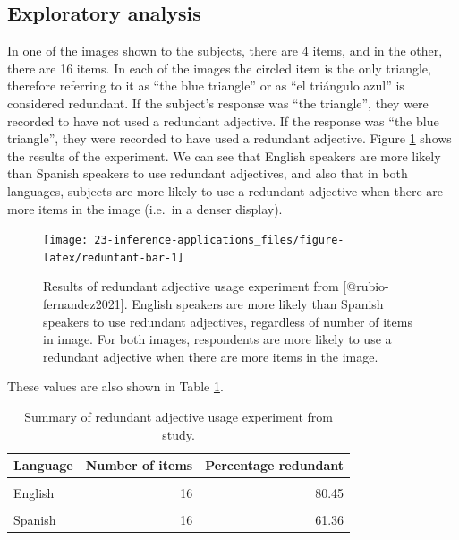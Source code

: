 \documentclass[
  10pt,
  openany]{book}
\begin{document}
\hypertarget{exploratory-analysis}{%
\subsection{Exploratory analysis}\label{exploratory-analysis}}

In one of the images shown to the subjects, there are 4 items, and in the other, there are 16 items.
In each of the images the circled item is the only triangle, therefore referring to it as ``the blue triangle'' or as ``el triángulo azul'' is considered redundant.
If the subject's response was ``the triangle'', they were recorded to have not used a redundant adjective.
If the response was ``the blue triangle'', they were recorded to have used a redundant adjective.
Figure \ref{fig:reduntant-bar} shows the results of the experiment.
We can see that English speakers are more likely than Spanish speakers to use redundant adjectives, and also that in both languages, subjects are more likely to use a redundant adjective when there are more items in the image (i.e.~in a denser display).

\begin{figure}[h]

{\centering \texttt{[image: 23-inference-applications\_files/figure-latex/reduntant-bar-1]} 

}

\caption{Results of redundant adjective usage experiment from [@rubio-fernandez2021]. English speakers are more likely than Spanish speakers to use redundant adjectives, regardless of number of items in image. For both images, respondents are more likely to use a redundant adjective when there are more items in the image.}\label{fig:reduntant-bar}
\end{figure}

These values are also shown in Table \ref{tab:redundant-table}.

\begin{table}[!h]

\caption{\label{tab:redundant-table}Summary of redundant adjective usage experiment from study.}
\centering
\begin{tabular}[t]{>{\raggedright\arraybackslash}p{10em}rr}
\toprule
Language & Number of items & Percentage redundant\\
\midrule
\cellcolor{gray!6}{English} & \cellcolor{gray!6}{4} & \cellcolor{gray!6}{37.27}\\
English & 16 & 80.45\\
\cellcolor{gray!6}{Spanish} & \cellcolor{gray!6}{4} & \cellcolor{gray!6}{2.73}\\
Spanish & 16 & 61.36\\
\bottomrule
\end{tabular}
\end{table}
\end{document}
